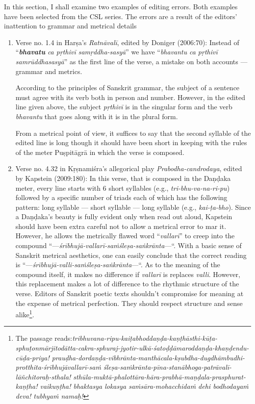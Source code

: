 In this section, I shall examine two examples of editing errors. Both examples have been selected from the CSL series. The errors are a result of the editors’ inattention to grammar and metrical details
\begin{enumerate}
\item Verse no. 1.4 in Harṣa’s \textsl{Ratnāvalī}, edited by Doniger (2006:70): Instead of “{\sl\bfseries bhavatu} \textsl{ca pṛthivī samṛddha-sasyā}” we have “\textsl{bhavantu} \textsl{ca pṛthivī samrūddhasasyā}” as the first line of the verse, a mistake on both accounts --- grammar and metrics. 

According to the principles of Sanskrit grammar, the subject of a sentence must agree with its verb both in person and number. However, in the edited line given above, the subject \textsl{pṛthivī} is in the singular form and the verb \textsl{bhavantu} that goes along with it is in the plural form. 

From a metrical point of view, it suffices to say that the second syllable of the edited line is long though it should have been short in keeping with the rules of the meter Puṣpitāgrā in which the verse is composed.  

\item Verse no. 4.32 in Kṛṣnamiśra’s allegorical play \textsl{Prabodha-candrodaya}, edited by Kapstein (2009:180):  In this verse, that is composed in the Daṇḍaka meter, every line starts with 6 short syllables (e.g., \textsl{tri-bhu-va-na-ri-pu}) followed by a specific number of triads each of which has the following pattern: long syllable --- short syllable --- long syllable (e.g., \textsl{kai-ṭa-bho}). Since a Daṇḍaka’s beauty is fully evident only when read out aloud, Kapstein should have been extra careful not to allow a metrical error to mar it. However, he allows the metrically flawed word “\textsl{vallarī}” to creep into the compound “---\textsl{śrībhujā-}\textsl{vallarī-}\textsl{saṁśleṣa-saṅkrānta}—“. With a basic sense of Sanskrit metrical aesthetics, one can easily conclude that the correct reading is “---\textsl{śrībhujā-}\textsl{valli-}\textsl{saṁśleṣa-saṅkrānta}—“. As to the meaning of the compound itself, it makes no difference if \textsl{vallarī} is replaces \textsl{valli}. However, this replacement makes a lot of difference to the rhythmic structure of the verse. Editors of Sanskrit poetic texts shouldn’t compromise for meaning at the expense of metrical perfection. They should respect structure and sense alike\footnote[12]{The passage reads:\textsl{tribhuvana-ripu-kaiṭabhoddaṇḍa-kaṇṭhāsthi-kūṭa-sphuṭo\-nmārjitodātta-cakra-sphuraj-jyotir-ulkā-śatoḍḍāmaroddaṇḍa-khaṇḍendu-cūḍa-priya! prauḍha-dordaṇḍa-vibhrānta-manthācala-kṣubdha-dugdhāmbudhi-protthita-śrībhujāvallarī-saṁ śleṣa-saṁkrānta-pīna-stanābhoga-patrāvalī-lāñchitoraḥ-sthala! sthūla-muktā-phalottāra-hāra-prabhā-maṇḍala-prasphurat-kaṇṭha! vaikuṇṭha! bhaktasya lokasya saṁsāra-mohacchidaṁ dehi bodhodayaṁ deva! tubhyaṁ namaḥ!}}.
\end{enumerate}

